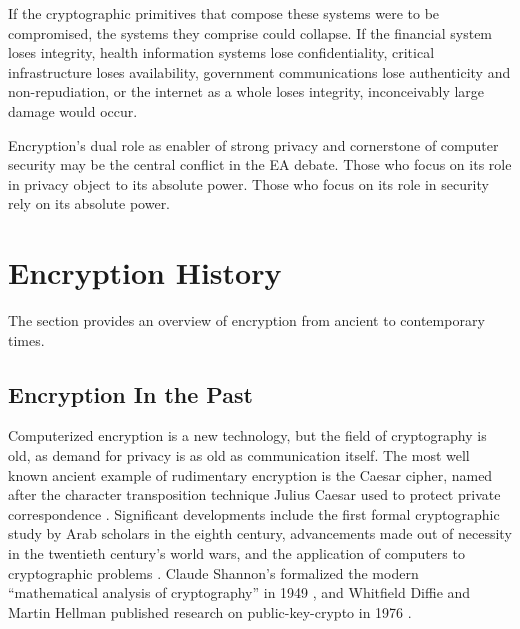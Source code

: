 
If the cryptographic primitives that compose these systems were to be compromised, the systems they comprise could
collapse. If the financial system loses integrity, health information systems lose confidentiality, critical
infrastructure loses availability, government communications lose authenticity and non-repudiation, or the internet as a
whole loses integrity, inconceivably large damage would occur.

Encryption's dual role as enabler of strong privacy and cornerstone of computer security may be the central conflict in
the EA debate. Those who focus on its role in privacy object to its absolute power. Those who focus on its role in
security rely on its absolute power.



\section{Encryption History}
\label{sec-crypto-history}

The section provides an overview of encryption from ancient to contemporary times.

\subsection{Encryption In the Past}
\label{sec-history-old}

Computerized encryption is a new technology, but the field of cryptography is old, as demand for privacy is as old as
communication itself. The most well known ancient example of rudimentary encryption is the Caesar cipher, named after
the character transposition technique Julius Caesar used to protect private correspondence
\cite{luciano_cryptology_1987}. Significant developments include the first formal cryptographic study by Arab scholars
in the eighth century, advancements made out of necessity in the twentieth century's world wars, and the application of
computers to cryptographic problems \cite{kahn_codebreakers_1996}. Claude Shannon's formalized the modern ``mathematical
analysis of cryptography'' in 1949 \cite{shannon_communication_1949}, and Whitfield Diffie and Martin Hellman published
research on \ac{public-key-crypto} in 1976 \cite{diffie_new_1976}.

